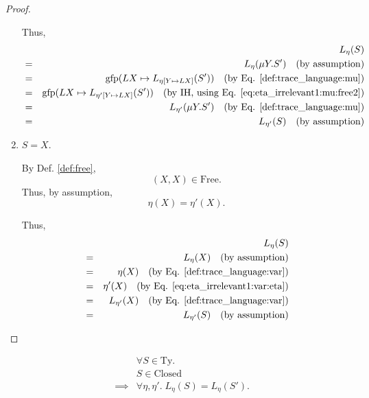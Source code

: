 \documentclass{llncs}
\newcommand*{\Ty}{\mathrm{Ty}}
\newcommand*{\gfp}{\mathrm{gfp}}
\newcommand*{\Free}{\mathrm{Free}}
\newcommand*{\Closed}{\mathrm{Closed}}
\renewcommand*{\|}{\;|\;}
\begin{document}
\begin{proof}
\begin{enumerate}
      Thus,
      \begin{eqnarray*}
        &&  L_\eta(S) \\
        &=& L_\eta(\mu Y.S')
        \quad \text{(by assumption)} \\
        &=& \gfp(LX \mapsto L_{\eta[Y \mapsto LX]}(S'))
        \quad \text{(by Eq. \ref{def:trace_language:mu})} \\
        &=& \gfp(LX \mapsto L_{\eta'[Y \mapsto LX]}(S'))
        \quad \text{(by IH, using Eq. \ref{eq:eta_irrelevant1:mu:free2})} \\
        &=& L_{\eta'}(\mu Y.S')
        \quad \text{(by Eq. \ref{def:trace_language:mu})} \\
        &=&  L_{\eta'}(S)
        \quad \text{(by assumption)}
      \end{eqnarray*}

    \item
      \label{case:eta_irrelevant1:var}
      $S = X$.

      By Def. \ref{def:free},
      \begin{equation}
        (X, X) \in \Free.
      \end{equation}
      Thus, by assumption,
      \begin{equation}
        \label{eq:eta_irrelevant1:var:eta}
        \eta(X) = \eta'(X).
      \end{equation}

      Thus,
      \begin{eqnarray*}
        && L_\eta(S) \\
        &=& L_\eta(X)
        \quad \text{(by assumption)} \\
        &=& \eta(X)
        \quad \text{(by Eq. \ref{def:trace_language:var})} \\
        &=& \eta'(X)
        \quad \text{(by Eq. \ref{eq:eta_irrelevant1:var:eta})} \\
        &=& L_{\eta'}(X)
        \quad \text{(by Eq. \ref{def:trace_language:var})} \\
        &=& L_{\eta'}(S)
        \quad \text{(by assumption)}
      \end{eqnarray*}

  \end{enumerate}
\end{proof}


\begin{lemma}
  \label{lemma:eta_irrelevant2}
  \begin{eqnarray*}
    &&         \forall S \in \Ty. \\
    &&         S \in \Closed \\
    &\implies& \forall \eta, \eta'.\; L_\eta(S) = L_\eta(S').
  \end{eqnarray*}
\end{lemma}
\end{document}
